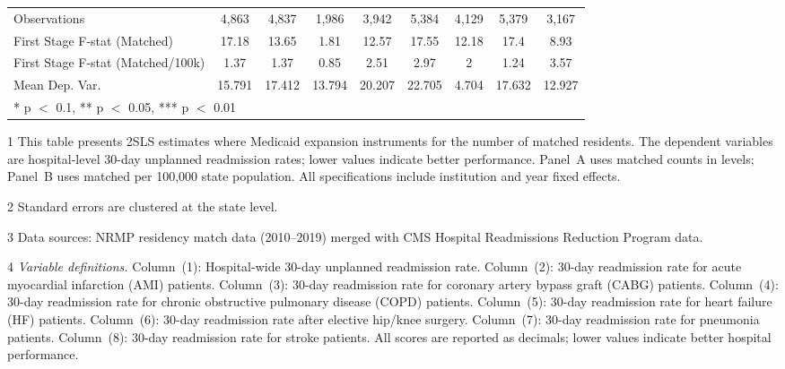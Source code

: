 \begin{table}[H]
{\begin{threeparttable}
\begin{tabular}[t]{lcccccccc}
\hspace{1em}Observations & 4,863 & 4,837 & 1,986 & 3,942 & 5,384 & 4,129 & 5,379 & 3,167\\
First Stage F-stat (Matched) & 17.18 & 13.65 & 1.81 & 12.57 & 17.55 & 12.18 & 17.4 & 8.93\\
First Stage F-stat (Matched/100k) & 1.37 & 1.37 & 0.85 & 2.51 & 2.97 & 2 & 1.24 & 3.57\\
Mean Dep. Var. & 15.791 & 17.412 & 13.794 & 20.207 & 22.705 & 4.704 & 17.632 & 12.927\\
\bottomrule
\multicolumn{9}{l}{\rule{0pt}{1em}* p $<$ 0.1, ** p $<$ 0.05, *** p $<$ 0.01}\\
\end{tabular}
\begin{tablenotes}
\item[1] \footnotesize{This table presents 2SLS estimates where Medicaid expansion instruments for
the number of matched residents. The dependent variables are hospital-level 30-day unplanned
readmission rates; lower values indicate better performance. Panel~A uses matched counts in levels;
Panel~B uses matched per 100,000 state population. All specifications include institution and year
fixed effects.}
\item[2] \footnotesize{Standard errors are clustered at the state level.}
\item[3] \footnotesize{Data sources: NRMP residency match data (2010--2019) merged with CMS
Hospital Readmissions Reduction Program data.}
\item[4] \footnotesize{\textit{Variable definitions.}
Column~(1): Hospital-wide 30-day unplanned readmission rate.
Column~(2): 30-day readmission rate for acute myocardial infarction (AMI) patients.
Column~(3): 30-day readmission rate for coronary artery bypass graft (CABG) patients.
Column~(4): 30-day readmission rate for chronic obstructive pulmonary disease (COPD) patients.
Column~(5): 30-day readmission rate for heart failure (HF) patients.
Column~(6): 30-day readmission rate after elective hip/knee surgery.
Column~(7): 30-day readmission rate for pneumonia patients.
Column~(8): 30-day readmission rate for stroke patients.
All scores are reported as decimals; lower values indicate better hospital performance.}
\end{tablenotes}
\end{threeparttable}}
\end{table}
